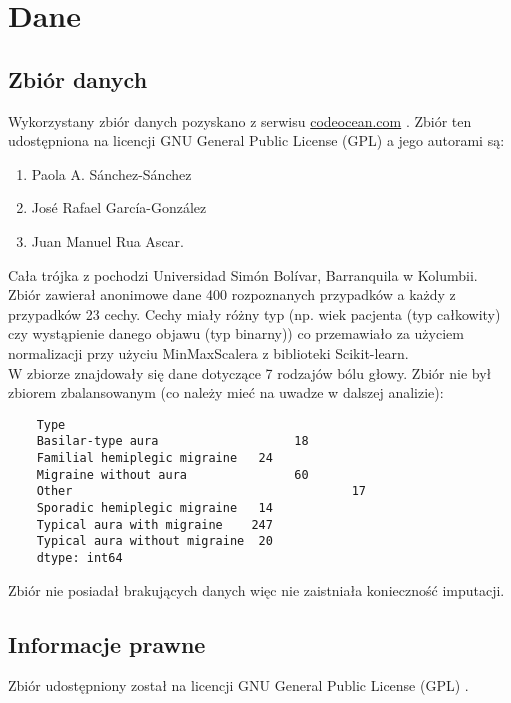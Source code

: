 \section{Dane}
\subsection{Zbiór danych}
Wykorzystany zbiór danych pozyskano z serwisu \url{codeocean.com} \cite{dane}. Zbiór ten udostępniona na licencji GNU General Public License (GPL) a jego autorami są: 

\begin{enumerate}
    \item Paola A. Sánchez-Sánchez
    \item José Rafael García-González
    \item Juan Manuel Rua Ascar. 
\end{enumerate}

\noindent
Cała trójka z pochodzi Universidad Simón Bolívar, Barranquila w Kolumbii.\\

\noindent
Zbiór zawierał anonimowe dane 400 rozpoznanych przypadków a każdy z przypadków 23 cechy. Cechy miały różny typ (np. wiek pacjenta (typ całkowity) czy wystąpienie danego objawu (typ binarny)) co przemawiało za użyciem normalizacji przy użyciu MinMaxScalera z biblioteki Scikit-learn.\\

\noindent
W zbiorze znajdowały się dane dotyczące 7 rodzajów bólu głowy.
Zbiór nie był zbiorem zbalansowanym (co należy mieć na uwadze w dalszej analizie):

\begin{verbatim}
    Type
    Basilar-type aura 		            18
    Familial hemiplegic migraine   24
    Migraine without aura 		        60
    Other 				                        17
    Sporadic hemiplegic migraine   14
    Typical aura with migraine 	  247
    Typical aura without migraine  20
    dtype: int64
\end{verbatim}

\noindent
Zbiór nie posiadał brakujących danych więc nie zaistniała konieczność imputacji.

\subsection{Informacje prawne}
\noindent
Zbiór udostępniony został na licencji GNU General Public License (GPL) \cite{dane}.\\

